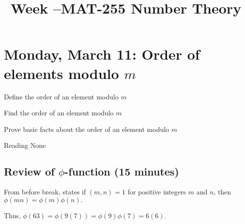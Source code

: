 \documentclass[letterpaper, 11 pt]{ximera}
\title{Week \week--MAT-255 Number Theory}
\begin{document}
\section{Monday, March 11: Order of elements modulo $m$}

\begin{obj}
\item Define the order of an element modulo $m$
\item Find the order of an element modulo $m$
\item Prove basic facts about the order of an element modulo $m$
\end{obj}


\begin{pre}
    \item[Reading] None
\end{pre}

\subsection{Review of $\phi$-function (15 minutes)}

\begin{remark}
    From before break,  states if $(m,n)=1$ for positive integers $m$ and $n$, then $\phi(mn)=\phi(m)\phi(n).$ 

    Thus, $\phi(63)=\phi(9(7))=\phi(9)\phi(7)=6(6).$
\end{remark}
\end{document}
